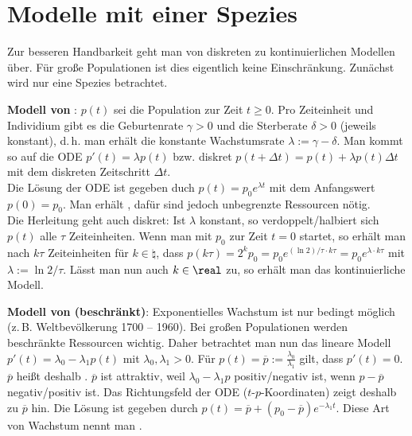 \section{%
    Modelle mit einer Spezies%
}

Zur besseren Handbarkeit geht man von diskreten zu kontinuierlichen Modellen über.
Für große Populationen ist dies eigentlich keine Einschränkung.
Zunächst wird nur eine Spezies betrachtet.

\textbf{Modell von }:
$p(t)$ sei die Population zur Zeit $t \ge 0$.
Pro Zeiteinheit und Individium gibt es die Geburtenrate $\gamma > 0$ und die Sterberate
$\delta > 0$ (jeweils konstant), d.\,h. man erhält die konstante Wachstumsrate
$\lambda := \gamma - \delta$.
Man kommt so auf die ODE $p'(t) = \lambda p(t)$ bzw. diskret
$p(t + \Delta t) = p(t) + \lambda p(t) \Delta t$
mit dem diskreten Zeitschritt $\Delta t$.\\
Die Lösung der ODE ist gegeben duch $p(t) = p_0 e^{\lambda t}$ mit dem Anfangswert $p(0) = p_0$.
Man erhält , dafür sind jedoch unbegrenzte Ressourcen nötig.\\
Die Herleitung geht auch diskret:
Ist $\lambda$ konstant, so verdoppelt/halbiert sich $p(t)$ alle $\tau$ Zeiteinheiten.
Wenn man mit $p_0$ zur Zeit $t = 0$ startet, so erhält man nach $k\tau$ Zeiteinheiten
für $k \in \natural$, dass $p(k\tau) = 2^k p_0 = p_0 e^{(\ln 2)/\tau \cdot k\tau}
= p_0 e^{\lambda \cdot k\tau}$ mit $\lambda := \ln 2/\tau$.
Lässt man nun auch $k \in \real$ zu, so erhält man das kontinuierliche Modell.

\linie

\textbf{Modell von  (beschränkt)}:
Exponentielles Wachstum ist nur bedingt möglich (z.\,B. Weltbevölkerung 1700 -- 1960).
Bei großen Populationen werden beschränkte Ressourcen wichtig.
Daher betrachtet man nun das lineare Modell $p'(t) = \lambda_0 - \lambda_1 p(t)$
mit $\lambda_0, \lambda_1 > 0$.
Für $p(t) = \overline{p} := \frac{\lambda_0}{\lambda_1}$ gilt, dass $p'(t) = 0$.
$\overline{p}$ heißt deshalb .
$\overline{p}$ ist attraktiv, weil $\lambda_0 - \lambda_1 p$ positiv/negativ ist,
wenn $p - \overline{p}$ negativ/positiv ist.
Das Richtungsfeld der ODE ($t$-$p$-Koordinaten) zeigt deshalb zu $\overline{p}$ hin.
Die Lösung ist gegeben durch $p(t) = \overline{p} + (p_0 - \overline{p}) e^{-\lambda_1 t}$.
Diese Art von Wachstum nennt man .

\linie

